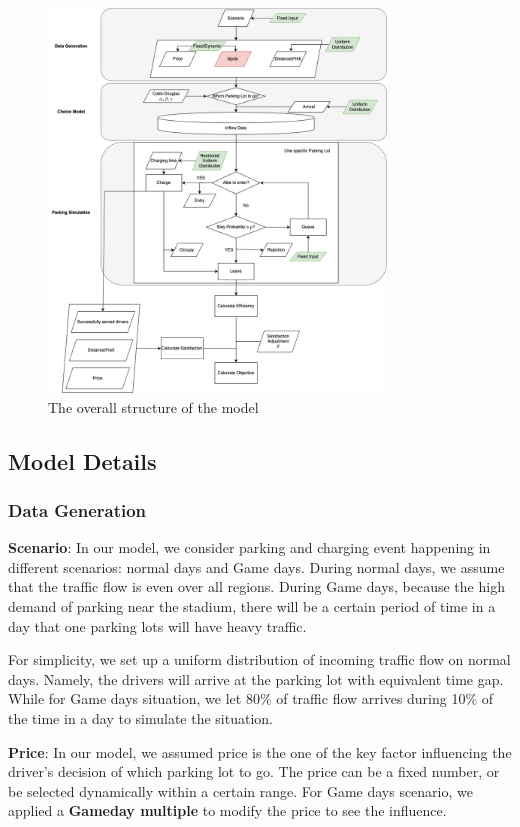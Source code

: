 \begin{figure}[t]
    \includegraphics[width = 0.8\textwidth] {figure/flowchart.png}
    \centering
    \caption{The overall structure of the model}
    \label{fig:flowchart}
    \end{figure}



\subsection{Model Details}
\subsubsection{Data Generation}
\textbf{Scenario}: In our model, we consider parking and charging event happening in different scenarios: normal days and Game days. During normal days, we assume that the traffic flow is even over all regions. During Game days, because the high demand of parking near the stadium, there will be a certain period of time in a day that one parking lots will have heavy traffic. 

For simplicity, we set up a uniform distribution of incoming traffic flow on normal days. Namely, the drivers will arrive at the parking lot with equivalent time gap. While for Game days situation, we let 80\% of traffic flow arrives during 10\% of the time in a day to simulate the situation. 

\textbf{Price}: In our model, we assumed price is the one of the key factor influencing the driver's decision of which parking lot to go. The price can be a fixed number, or be selected dynamically within a certain range. For Game days scenario, we applied a \textbf{Gameday multiple} to modify the price to see the influence. 


